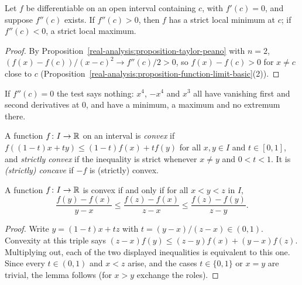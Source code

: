\begin{corollary}\label{real-analysis:corollary-second-derivative-test}
Let $f$ be differentiable on an open interval containing $c$, with $f'(c) = 0$, and suppose $f''(c)$ exists. If $f''(c) > 0$, then $f$ has a strict local minimum at $c$; if $f''(c) < 0$, a strict local maximum.
\end{corollary}

\begin{proof}
By Proposition~\ref{real-analysis:proposition-taylor-peano} with $n = 2$, $(f(x) - f(c))/(x - c)^2 \to f''(c)/2 > 0$, so $f(x) - f(c) > 0$ for $x \neq c$ close to $c$ (Proposition~\ref{real-analysis:proposition-function-limit-basic}(2)).
\end{proof}

\begin{counterexample}\label{real-analysis:counterexample-second-derivative}
If $f''(c) = 0$ the test says nothing: $x^4$, $-x^4$ and $x^3$ all have vanishing first and second derivatives at $0$, and have a minimum, a maximum and no extremum there.
\end{counterexample}

\begin{definition}\label{real-analysis:definition-convex}
A function $f \colon I \to \mathbb{R}$ on an interval is \emph{convex} if $f((1 - t)x + ty) \leq (1 - t)f(x) + tf(y)$ for all $x, y \in I$ and $t \in [0, 1]$, and \emph{strictly convex} if the inequality is strict whenever $x \neq y$ and
$0 < t < 1$. It is \emph{(strictly) concave} if $-f$ is (strictly) convex.
\end{definition}

\begin{lemma}\label{real-analysis:lemma-three-slopes}
A function $f \colon I \to \mathbb{R}$ is convex if and only if for all $x < y < z$ in $I$,
\[
\frac{f(y) - f(x)}{y - x} \leq \frac{f(z) - f(x)}{z - x} \leq \frac{f(z) - f(y)}{z - y}.
\]
\end{lemma}

\begin{proof}
Write $y = (1 - t)x + tz$ with $t = (y - x)/(z - x) \in (0, 1)$. Convexity at this triple says $(z - x)f(y) \leq (z - y)f(x) + (y - x)f(z)$. Multiplying out, each of the two displayed inequalities is equivalent to
this one. Since every $t \in (0, 1)$ and $x < z$ arise, and the cases $t \in \{0, 1\}$ or $x = y$ are trivial, the lemma follows (for $x > y$ exchange the roles).
\end{proof}

